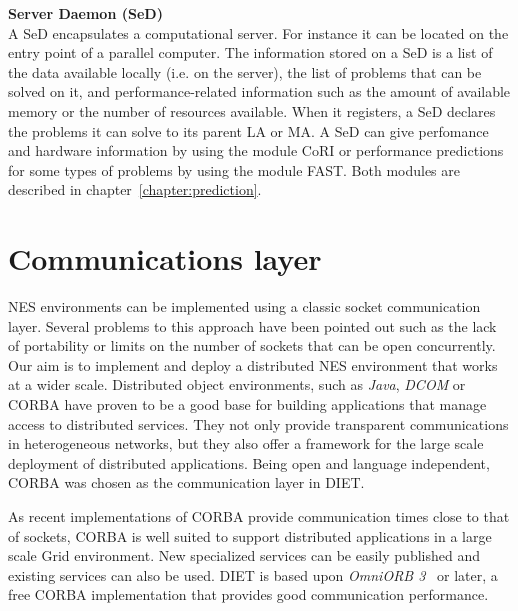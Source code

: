 \begin{description}
\item \textbf{Server Daemon (SeD)}\\
  A SeD encapsulates a computational server. For instance it can be
  located on the entry point of a parallel computer. The information
  stored on a SeD is a list of the data available locally (i.e. on
  the server), the list of problems
  that can be solved on it, and performance-related information such
  as the amount of available memory or the number of resources
  available. When it registers, a SeD declares the problems it can
  solve to its parent LA or MA.  A SeD can give perfomance and hardware
  information by using the module CoRI or performance
  predictions for some types of
  problems by using the module FAST.
  Both modules are described in chapter~\ref{chapter:prediction}.

\end{description}


\section{Communications layer}
\label{sec:CORBA}

NES environments can be implemented using a classic socket
communication layer.  Several problems to this approach have been
pointed out such as the lack of portability or limits on the
number of sockets that can be open concurrently.
Our aim is to implement and deploy a distributed NES
environment that works at a wider scale. Distributed object
environments, such as \emph{Java}, \emph{DCOM} or CORBA have proven to
be a good base for building applications that manage access to
distributed services. They not only provide transparent communications
in heterogeneous networks, but they also offer a framework for the
large scale deployment of distributed applications. Being open and
language independent, CORBA was chosen as the communication layer in
DIET.

As recent implementations of CORBA provide communication times close to
that of sockets, CORBA is well suited to support distributed
applications in a large scale Grid environment. New specialized
services can be easily published and existing services can also be
used.  DIET is based upon \emph{OmniORB 3}~\cite{OMNIORB} or later,
a free CORBA implementation that provides good communication
performance.



